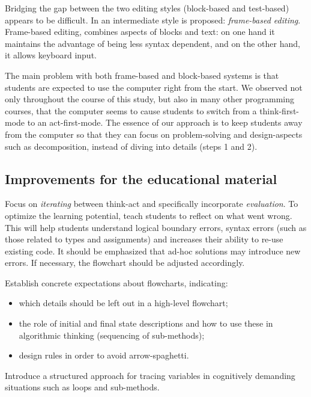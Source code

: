 Bridging the gap between the two editing styles (block-based and test-based)
appears to be difficult. In \cite{Kolling:2015} an intermediate style is
proposed: \emph{frame-based editing}. Frame-based editing, combines aspects
of blocks and text: on one hand it maintains the advantage of being less
syntax dependent, and on the other hand, it allows keyboard input.

The main problem with both frame-based and block-based systems is that
students are expected to use the computer right from the start. We observed
not only throughout the course of this study, but also in many other
programming courses, that the computer seems to cause students to switch from
a think-first-mode to an act-first-mode. The essence of our approach is to
keep students away from the computer so that they can focus on
problem-solving and design-aspects such as decomposition, instead of diving
into details (steps 1 and 2).


\subsection*{Improvements for the educational material}\label{sec:improvements}

\begin{description}[leftmargin=1em]

\item[Reflection:] Focus on \emph{iterating} between think-act and
    specifically incorporate \emph{evaluation}. To optimize the learning
    potential, teach students to reflect on what went wrong. This will help
    students understand logical boundary errors, syntax errors (such as
    those related to types and assignments) and increases their ability to
    re-use existing code. It should be emphasized that ad-hoc solutions may
    introduce new errors. If necessary, the flowchart should be adjusted
    accordingly.

\item[Flowcharts:] Establish concrete expectations about flowcharts, indicating:
    \begin{itemize}
    \item which details should be left out in a high-level flowchart;

    \item the role of initial and final state descriptions and how to use
        these in algorithmic thinking (sequencing of sub-methods);

    \item design rules in order to avoid arrow-spaghetti.
    \end{itemize}


\item[Tracing tables:] Introduce a structured approach for tracing
    variables in cognitively demanding situations such as loops and
    sub-methods.


\end{description}
